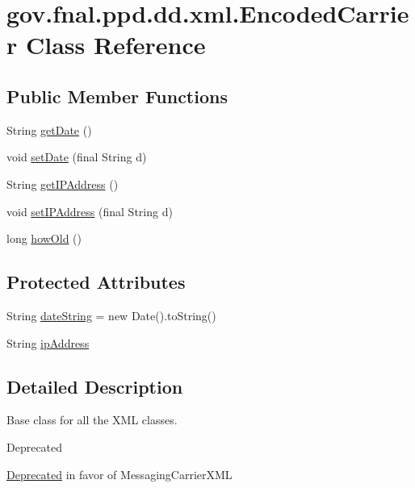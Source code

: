 \hypertarget{classgov_1_1fnal_1_1ppd_1_1dd_1_1xml_1_1EncodedCarrier}{\section{gov.\-fnal.\-ppd.\-dd.\-xml.\-Encoded\-Carrier Class Reference}
\label{classgov_1_1fnal_1_1ppd_1_1dd_1_1xml_1_1EncodedCarrier}
}
\subsection*{Public Member Functions}
\begin{DoxyCompactItemize}
\item 
String \hyperlink{classgov_1_1fnal_1_1ppd_1_1dd_1_1xml_1_1EncodedCarrier_a7f0d7411aee2e510e85b66cf111fb51c}{get\-Date} ()
\item 
void \hyperlink{classgov_1_1fnal_1_1ppd_1_1dd_1_1xml_1_1EncodedCarrier_ac801c5a72181571aeaddff4321669133}{set\-Date} (final String d)
\item 
String \hyperlink{classgov_1_1fnal_1_1ppd_1_1dd_1_1xml_1_1EncodedCarrier_a27e11d86bf75a88340237c060038b288}{get\-I\-P\-Address} ()
\item 
void \hyperlink{classgov_1_1fnal_1_1ppd_1_1dd_1_1xml_1_1EncodedCarrier_a8f73e4716b57c5330045fb2868252904}{set\-I\-P\-Address} (final String d)
\item 
long \hyperlink{classgov_1_1fnal_1_1ppd_1_1dd_1_1xml_1_1EncodedCarrier_a2ebe62987fc3e79a6a32f636935da736}{how\-Old} ()
\end{DoxyCompactItemize}
\subsection*{Protected Attributes}
\begin{DoxyCompactItemize}
\item 
String \hyperlink{classgov_1_1fnal_1_1ppd_1_1dd_1_1xml_1_1EncodedCarrier_a54239a994c69adb2dde01ebb6e1e69a9}{date\-String} = new Date().to\-String()
\item 
String \hyperlink{classgov_1_1fnal_1_1ppd_1_1dd_1_1xml_1_1EncodedCarrier_a28c58a66382080af31eed8d56a53b62a}{ip\-Address}
\end{DoxyCompactItemize}


\subsection{Detailed Description}
Base class for all the X\-M\-L classes. \begin{DoxyRefDesc}{Deprecated}
\item[\hyperlink{deprecated__deprecated000014}{Deprecated}]in favor of Messaging\-Carrier\-X\-M\-L\end{DoxyRefDesc}



